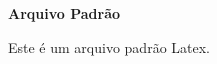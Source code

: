 \documentclass[12pt,a4papper]{article}
\begin{document}
\begin{center}
\textbf{Arquivo Padrão}
\end{center}

Este é um arquivo padrão Latex.
\end{document}
